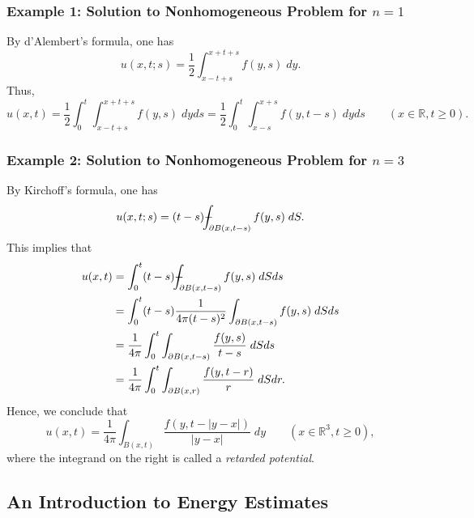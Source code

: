 \documentclass{article}
\def\Xint#1{\mathchoice
	{\XXint\displaystyle\textstyle{#1}}%
	{\XXint\textstyle\scriptstyle{#1}}%
	{\XXint\scriptstyle\scriptscriptstyle{#1}}%
	{\XXint\scriptscriptstyle\scriptscriptstyle{#1}}%
	\!\int}
\def\XXint#1#2#3{{\setbox0=\hbox{$#1{#2#3}{\int}$ }
		\vcenter{\hbox{$#2#3$ }}\kern-0.6\wd0}}
\def\dashint{\Xint-}
\numberwithin{equation}{section}
\begin{document}
	\subsubsection{Example 1: Solution to Nonhomogeneous Problem for \texorpdfstring{$n = 1$}{n=1}}
	By d'Alembert's formula, one has 
	\begin{equation*}
		u(x,t;s) = \frac{1}{2}\int_{x -t + s}^{x + t + s}f(y,s)\;dy. 
	\end{equation*}
	Thus, 
	\begin{equation*}
		u(x,t) = \frac{1}{2}\int_{0}^{t}\int_{x - t + s}^{x + t + s}f(y,s)\;dyds = \frac{1}{2}\int_0^t\int_{x - s}^{x + s}f(y,t-s)\;dyds \qquad (x \in \mathbb{R}, t \geq 0).
	\end{equation*}
	
	\subsubsection{Example 2: Solution to Nonhomogeneous Problem for \texorpdfstring{$n = 3$}{n=3}}
	
	By Kirchoff's formula, one has 
	\begin{equation*}
		u(x,t;s) = (t-s)\dashint_{\partial B(x,t -s)}f(y,s)\;dS. 
	\end{equation*}
	This implies that 
	\begin{align*}
		\begin{split}
			u(x, t) &= \int_{0}^{t}(t - s)\dashint_{\partial B(x, t -s)}f(y,s)\;dSds \\
			&= \int_{0}^{t}(t - s)\frac{1}{4\pi(t - s)^{2}}\int_{\partial B(x, t - s)}f(y,s)\;dSds \\
			&= \frac{1}{4\pi}\int_{0}^{t}\int_{\partial B(x, t -s)}\frac{f(y,s)}{t - s}\;dSds \\
			&= \frac{1}{4\pi}\int_{0}^{t}\int_{\partial B(x,r)}\frac{f(y, t - r)}{r}\;dSdr. 
		\end{split}
	\end{align*}
	Hence, we conclude that 
	\begin{equation*}
		u(x,t) = \frac{1}{4\pi}\int_{B(x,t)}\frac{f(y, t - |y - x|)}{|y - x|}\;dy \qquad (x \in \mathbb{R}^3, t \geq 0), 
	\end{equation*}
	where the integrand on the right is called a \textit{retarded potential}. 
	
	\subsection{An Introduction to Energy Estimates}
	\label{subsec:intro_energy_estimate}
	
\end{document}

